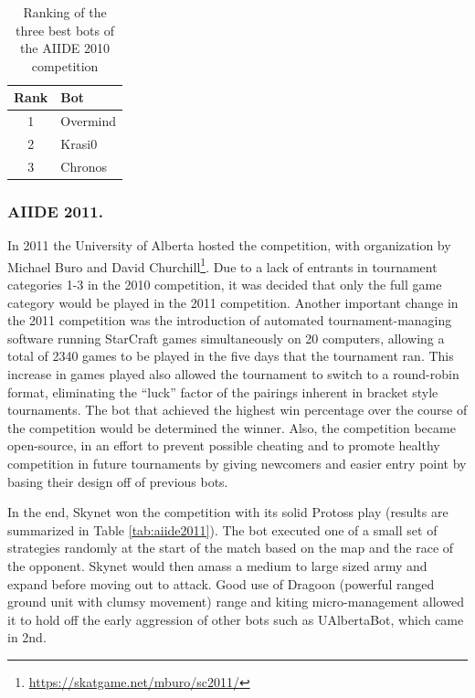 \documentclass{llncs}
\begin{document}
\begin{table}[!t]
\caption{Ranking of the three best bots of the AIIDE 2010 competition}
\label{tab:aiide2010}
\centering
\begin{tabular}{|c|l|}
\hline
{\bfseries Rank} & {\bfseries Bot}\\
\hline
1 & Overmind \\
2 & Krasi0 \\
3 & Chronos \\
\hline
\end{tabular}
\end{table}

\subsubsection{AIIDE 2011.}

In 2011 the University of Alberta hosted the competition, with organization by Michael Buro and
David Churchill\footnote{\url{https://skatgame.net/mburo/sc2011/}}. Due to a lack of entrants in tournament categories 1-3 in the 2010 competition, it was
decided that only the full game category would be played in the 2011 competition. Another important
change in the 2011 competition was the introduction of automated tournament-managing software running
StarCraft games simultaneously on 20 computers, allowing a total of 2340 games to be played in the five days that the tournament ran. 
This increase in games played also allowed the tournament
to switch to a round-robin format, eliminating the ``luck'' factor of the pairings inherent in bracket
style tournaments. The bot that achieved the highest win percentage over the course of the competition would
be determined the winner. Also, the competition became open-source, in an effort 
to prevent possible cheating and to promote healthy competition in future tournaments by giving
newcomers and easier entry point by basing their design off of previous bots.

In the  end, Skynet  won the competition  with its solid  Protoss play
(results  are  summarized   in  Table  \ref{tab:aiide2011}).  The  bot
executed one of a small set of strategies randomly at the start of the
match based on the map and the race of the opponent. Skynet would then
amass a  medium to large  sized army and  expand before moving  out to
attack. Good  use of Dragoon (powerful ranged ground unit with clumsy movement) range and  kiting micro-management allowed
it to hold off the early aggression of other bots such as UAlbertaBot,
which came in 2nd.
\end{document}
